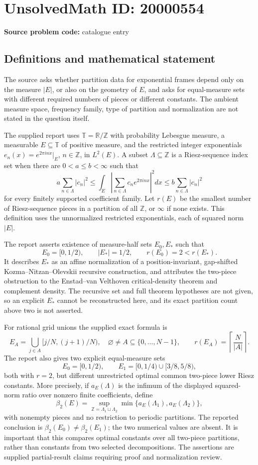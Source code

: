 \documentclass[11pt]{article}
\newcommand{\Z}{\mathbb{Z}}
\newcommand{\R}{\mathbb{R}}
\begin{document}
\section*{UnsolvedMath ID: 20000554}
\textbf{Source problem code:} catalogue entry
\subsection{Definitions and mathematical statement}
The source asks whether partition data for exponential frames depend only on the measure \(|E|\), or also on the geometry of \(E\), and asks for equal-measure sets with different required numbers of pieces or different constants. The ambient measure space, frequency family, type of partition and normalization are not stated in the question itself.

The supplied report uses \(\mathbb T=\R/\Z\) with probability Lebesgue measure, a measurable \(E\subseteq\mathbb T\) of positive measure, and the restricted integer exponentials \(e_n(x)=e^{2\pi i nx}|_E\), \(n\in\Z\), in \(L^2(E)\). A subset \(\Lambda\subseteq\Z\) is a Riesz-sequence index set when there are \(0<a\le b<\infty\) such that
\[
 a\sum_{n\in\Lambda}|c_n|^2\le
 \int_E\left|\sum_{n\in\Lambda}c_ne^{2\pi i nx}\right|^2dx
 \le b\sum_{n\in\Lambda}|c_n|^2
\]
for every finitely supported coefficient family. Let \(r(E)\) be the smallest number of Riesz-sequence pieces in a partition of all \(\Z\), or \(\infty\) if none exists. This definition uses the unnormalized restricted exponentials, each of squared norm \(|E|\).

The report asserts existence of measure-half sets \(E_0,E_*\) such that
\[
 E_0=[0,1/2),\qquad |E_*|=1/2,\qquad r(E_0)=2<r(E_*).
\]
It describes \(E_*\) as an affine normalization of a position-invariant, gap-shifted Kozma--Nitzan--Olevskii recursive construction, and attributes the two-piece obstruction to the Enstad--van Velthoven critical-density theorem and complement density. The recursive set and full theorem hypotheses are not given, so an explicit \(E_*\) cannot be reconstructed here, and its exact partition count above two is not asserted.

For rational grid unions the supplied exact formula is
\[
 E_A=\bigcup_{j\in A}[j/N,(j+1)/N),\quad
 \varnothing\ne A\subseteq\{0,\ldots,N-1\},\qquad
 r(E_A)=\left\lceil\frac N{|A|}\right\rceil.
\]
The report also gives two explicit equal-measure sets
\[
 E_0=[0,1/2),\qquad E_1=[0,1/4)\cup[3/8,5/8),
\]
both with \(r=2\), but different unrestricted optimal common two-piece lower Riesz constants. More precisely, if \(a_E(\Lambda)\) is the infimum of the displayed squared-norm ratio over nonzero finite coefficients, define
\[
 \beta_2(E)=\sup_{\Z=\Lambda_1\sqcup\Lambda_2}
 \min\{a_E(\Lambda_1),a_E(\Lambda_2)\},
\]
with nonempty pieces and no restriction to periodic partitions. The reported conclusion is \(\beta_2(E_0)\ne\beta_2(E_1)\); the two numerical values are absent. It is important that this compares optimal constants over all two-piece partitions, rather than constants from two selected decompositions. The assertions are supplied partial-result claims requiring proof and normalization review.
\end{document}
